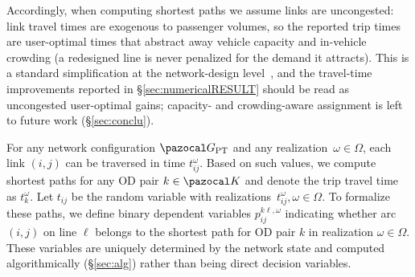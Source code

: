 \documentclass[a4paper,fleqn]{cas-sc}
\begin{document}
Accordingly, when computing shortest paths we assume links are uncongested: 
link travel times are exogenous to passenger volumes, so the reported trip times are user-optimal times that abstract away vehicle capacity and in-vehicle crowding (a redesigned line is never penalized for the demand it attracts). This is a standard simplification at the network-design level~\citep{goerigk2017line, schobel2022cheapest, john2014improved}, and the travel-time improvements reported in \S\ref{sec:numericalRESULT} should be read as uncongested user-optimal gains; capacity- and crowding-aware assignment is left to future work (\S\ref{sec:conclu}).


For any network configuration $\pazocal G_\text{PT}$ and any realization~$\omega\in\Omega$, each link $(i,j)$ can be traversed in time $t_{ij}^\omega$. Based on such values, we compute shortest paths for any OD pair $k\in\pazocal K$ and denote the trip travel time as $t_k^\omega$.  Let $t_{ij}$ be the random variable with realizations~$t_{ij}^\omega,\omega\in\Omega$. 
%
%
To formalize these paths, we define binary dependent variables $p_{ij}^{k\ell,\omega}$ indicating whether arc $(i,j)$ on line $\ell$ belongs to the shortest path for OD pair $k$ in realization $\omega\in\Omega$. These variables are uniquely determined by the network state and computed algorithmically (\S\ref{sec:alg}) rather than being direct decision variables.
\end{document}
